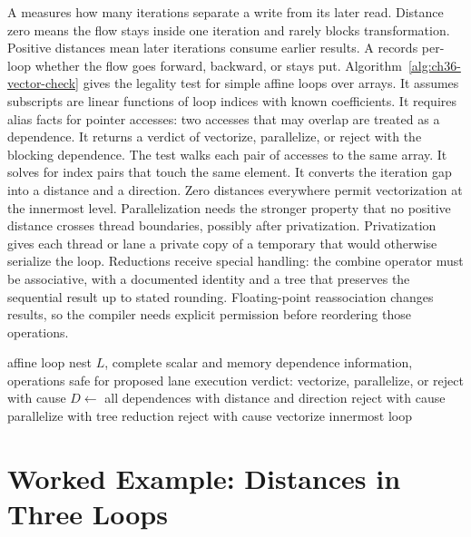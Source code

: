 A  measures how many iterations separate a write from its later read.
Distance zero means the flow stays inside one iteration and rarely blocks transformation.
Positive distances mean later iterations consume earlier results.
A  records per-loop whether the flow goes forward, backward, or stays put.
Algorithm~\ref{alg:ch36-vector-check} gives the legality test for simple affine loops over arrays.
It assumes subscripts are linear functions of loop indices with known coefficients.
It requires alias facts for pointer accesses: two accesses that may overlap are treated as a dependence.
It returns a verdict of vectorize, parallelize, or reject with the blocking dependence.
The test walks each pair of accesses to the same array.
It solves for index pairs that touch the same element.
It converts the iteration gap into a distance and a direction.
Zero distances everywhere permit vectorization at the innermost level.
Parallelization needs the stronger property that no positive distance crosses thread boundaries, possibly after privatization.
Privatization gives each thread or lane a private copy of a temporary that would otherwise serialize the loop.
Reductions receive special handling: the combine operator must be associative, with a documented identity and a tree that preserves the sequential result up to stated rounding.
Floating-point reassociation changes results, so the compiler needs explicit permission before reordering those operations.

\begin{algorithm}[htbp]
\caption{Legality check for vectorizing an affine loop nest}\label{alg:ch36-vector-check}
\begin{pseudocode}
\Require affine loop nest $L$, complete scalar and memory dependence information, operations safe for proposed lane execution
\Ensure verdict: vectorize, parallelize, or reject with cause
\State $D \gets$ all dependences with distance and direction
\State \Return reject with cause
\EndIf
{}
\State \Return parallelize with tree reduction
\EndIf
{}
\State \Return reject with cause
\EndIf
\State \Return vectorize innermost loop
\end{pseudocode}
\end{algorithm}

\section{Worked Example: Distances in Three Loops}\label{sec:ch36-worked}

